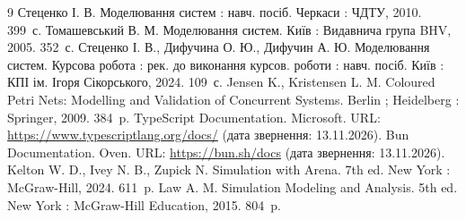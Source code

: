 \begin{thebibliography}{9}
 Стеценко І. В. Моделювання систем : навч. посіб. Черкаси : ЧДТУ, 2010. 399~с.
 Томашевський В. М. Моделювання систем. Київ : Видавнича група BHV, 2005. 352~с.
 Стеценко І. В., Дифучина О. Ю., Дифучин А. Ю. Моделювання систем. Курсова робота : рек. до виконання курсов. роботи : навч. посіб. Київ : КПІ ім. Ігоря Сікорського, 2024. 109~с.
 Jensen K., Kristensen L. M. Coloured Petri Nets: Modelling and Validation of Concurrent Systems. Berlin ; Heidelberg : Springer, 2009. 384~p.
 TypeScript Documentation. Microsoft. URL: \url{https://www.typescriptlang.org/docs/} (дата звернення: 13.11.2026).
 Bun Documentation. Oven. URL: \url{https://bun.sh/docs} (дата звернення: 13.11.2026).
 Kelton W. D., Ivey N. B., Zupick N. Simulation with Arena. 7th ed. New York : McGraw-Hill, 2024. 611~p.
 Law A. M. Simulation Modeling and Analysis. 5th ed. New York : McGraw-Hill Education, 2015. 804~p.
\end{thebibliography}
